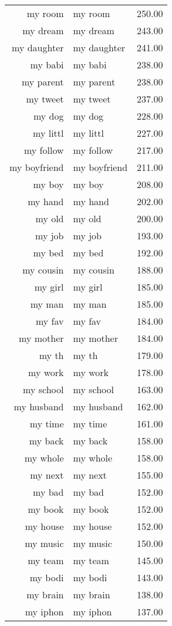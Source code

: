 \begin{table}[ht]
\begin{tabular}{rlr}
  my room & my room & 250.00 \\ 
  my dream & my dream & 243.00 \\ 
  my daughter & my daughter & 241.00 \\ 
  my babi & my babi & 238.00 \\ 
  my parent & my parent & 238.00 \\ 
  my tweet & my tweet & 237.00 \\ 
  my dog & my dog & 228.00 \\ 
  my littl & my littl & 227.00 \\ 
  my follow & my follow & 217.00 \\ 
  my boyfriend & my boyfriend & 211.00 \\ 
  my boy & my boy & 208.00 \\ 
  my hand & my hand & 202.00 \\ 
  my old & my old & 200.00 \\ 
  my job & my job & 193.00 \\ 
  my bed & my bed & 192.00 \\ 
  my cousin & my cousin & 188.00 \\ 
  my girl & my girl & 185.00 \\ 
  my man & my man & 185.00 \\ 
  my fav & my fav & 184.00 \\ 
  my mother & my mother & 184.00 \\ 
  my th & my th & 179.00 \\ 
  my work & my work & 178.00 \\ 
  my school & my school & 163.00 \\ 
  my husband & my husband & 162.00 \\ 
  my time & my time & 161.00 \\ 
  my back & my back & 158.00 \\ 
  my whole & my whole & 158.00 \\ 
  my next & my next & 155.00 \\ 
  my bad & my bad & 152.00 \\ 
  my book & my book & 152.00 \\ 
  my house & my house & 152.00 \\ 
  my music & my music & 150.00 \\ 
  my team & my team & 145.00 \\ 
  my bodi & my bodi & 143.00 \\ 
  my brain & my brain & 138.00 \\ 
  my iphon & my iphon & 137.00 \\ 

\end{tabular}
\end{table}

